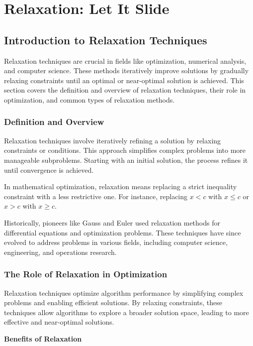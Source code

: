 \documentclass[12pt]{book} %
\begin{document}
\chapter{Relaxation: Let It Slide}

\section{Introduction to Relaxation Techniques}

Relaxation techniques are crucial in fields like optimization, numerical analysis, and computer science. These methods iteratively improve solutions by gradually relaxing constraints until an optimal or near-optimal solution is achieved. This section covers the definition and overview of relaxation techniques, their role in optimization, and common types of relaxation methods.

\subsection{Definition and Overview}

Relaxation techniques involve iteratively refining a solution by relaxing constraints or conditions. This approach simplifies complex problems into more manageable subproblems. Starting with an initial solution, the process refines it until convergence is achieved.

In mathematical optimization, relaxation means replacing a strict inequality constraint with a less restrictive one. For instance, replacing \(x < c\) with \(x \leq c\) or \(x > c\) with \(x \geq c\).

Historically, pioneers like Gauss and Euler used relaxation methods for differential equations and optimization problems. These techniques have since evolved to address problems in various fields, including computer science, engineering, and operations research.

\subsection{The Role of Relaxation in Optimization}

Relaxation techniques optimize algorithm performance by simplifying complex problems and enabling efficient solutions. By relaxing constraints, these techniques allow algorithms to explore a broader solution space, leading to more effective and near-optimal solutions.

\textbf{Benefits of Relaxation}
\end{document}
